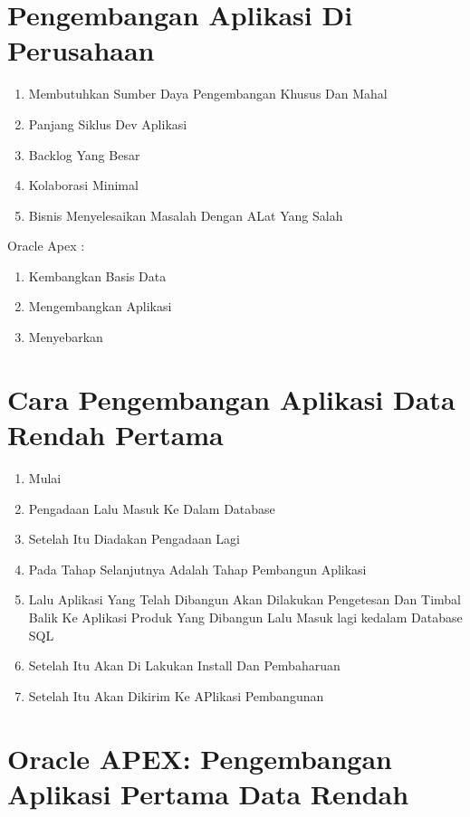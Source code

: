 \documentclass[12pt, times new roman, a4paper]{article}
\begin{document}
\section{Pengembangan Aplikasi Di Perusahaan}
\begin{enumerate}
    \item Membutuhkan Sumber Daya Pengembangan Khusus Dan Mahal
    \item Panjang Siklus Dev Aplikasi
    \item Backlog Yang Besar
    \item Kolaborasi Minimal
    \item Bisnis Menyelesaikan Masalah Dengan ALat Yang Salah \\
    \end{enumerate}
    Oracle Apex :
    \begin{enumerate}
        \item Kembangkan Basis Data
        \item Mengembangkan Aplikasi
        \item Menyebarkan
    \end{enumerate}
    \section{Cara Pengembangan Aplikasi Data Rendah Pertama}
    \begin{enumerate}
        \item Mulai
        \item Pengadaan Lalu Masuk Ke Dalam Database
        \item Setelah Itu Diadakan Pengadaan Lagi
        \item Pada Tahap Selanjutnya Adalah Tahap Pembangun Aplikasi
        \item Lalu Aplikasi Yang Telah Dibangun Akan Dilakukan Pengetesan Dan Timbal Balik Ke Aplikasi Produk Yang Dibangun Lalu Masuk lagi kedalam Database SQL
        \item Setelah Itu Akan Di Lakukan Install Dan Pembaharuan
        \item Setelah Itu Akan Dikirim Ke APlikasi Pembangunan
    \end{enumerate}

\section{Oracle APEX: Pengembangan Aplikasi Pertama Data Rendah}
\end{document}
